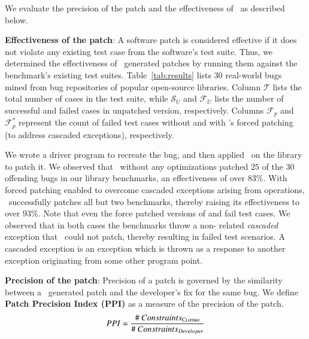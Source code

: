 We evaluate the precision of the patch and the effectiveness of \tool\ as
described below.

\begin{mylist}

\item \textbf{Effectiveness of the patch}: A software patch is considered
effective if it does not violate any existing test case from the software's test
suite. Thus, we determined the effectiveness of \tool\ generated patches by
running them against the benchmark's existing test suites.
Table~\ref{tab:results} lists $30$ real-world bugs mined from bug repositories
of popular open-source libraries. Column $\mathcal{T}$ lists the total number
of cases in the test suite, while $\mathcal{S}_{U}$ and $\mathcal{F}_{U}$ lists
the number of successful and failed cases in unpatched version, respectively.
Columns $\mathcal{F}_{p}$ and $\mathcal{F}_{p}^{*}$ represent the count of
failed test cases without and with \tool{}'s forced patching (to address
cascaded exceptions), respectively.

We wrote a driver program to recreate the bug, and then applied \tool\ on the
library to patch it. We observed that \tool\ without any optimizations patched
$25$ of the $30$ offending bugs in our library benchmarks, an effectiveness of
over $83\%$. With forced patching enabled to overcome cascaded exceptions arising
from  operations, \tool\ successfully patches all but two
benchmarks, thereby raising its effectiveness to over $93$\%. Note that even the
force patched versions of  and 
fail test cases. We observed that in both cases the benchmarks throw a
non- related \textit{cascaded} exception that \tool\ could not patch,
thereby resulting in failed test scenarios. A cascaded exception is an
exception which is thrown as a response to another exception originating 
from some other program point.

\item \textbf{Precision of the patch}: Precision of a patch is governed by the
similarity between a \tool\ generated patch and the developer's fix for the same
bug. We define \textbf{Patch Precision Index (PPI)} as a measure of the
precision of the patch.
$$PPI = \frac{\#~Constraints_{\textsc{Clotho}}}{\#~Constraints_{Developer}}$$


\end{mylist}
